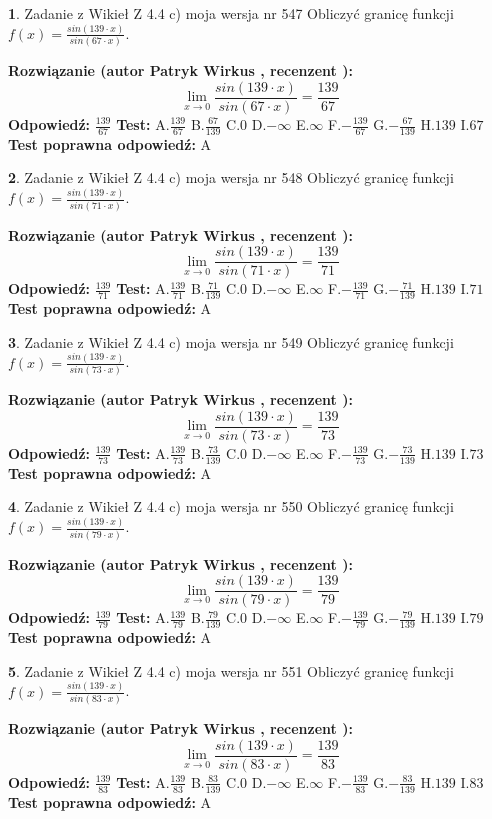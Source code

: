 \documentclass[12pt, a4paper]{article}
\theoremstyle{definition} %
\newtheorem{zad}{}
\newcommand{\zadStart}[1]{\begin{zad}#1\newline}
\newcommand{\zadStop}{\end{zad}}
\newcommand{\rozwStart}[2]{\noindent \textbf{Rozwiązanie (autor #1 , recenzent #2): }\newline}
\newcommand{\rozwStop}{\newline}
\newcommand{\odpStart}{\noindent \textbf{Odpowiedź:}\newline}
\newcommand{\odpStop}{\newline}
\newcommand{\testStart}{\noindent \textbf{Test:}\newline}
\newcommand{\testStop}{\newline}
\newcommand{\kluczStart}{\noindent \textbf{Test poprawna odpowiedź:}\newline}
\newcommand{\kluczStop}{\newline}
\begin{document}
\zadStart{Zadanie z Wikieł Z 4.4 c) moja wersja nr 547}
Obliczyć granicę funkcji $f(x)=\frac{sin(139\cdot x)}{sin(67\cdot x)}$.
\zadStop
\rozwStart{Patryk Wirkus}{}
$$\lim\limits_{x\to 0}\frac{sin(139\cdot x)}{sin(67\cdot x)}=
\frac{139}{67}$$
\rozwStop
\odpStart
$\frac{139}{67}$
\odpStop
\testStart
A.$\frac{139}{67}$
B.$\frac{67}{139}$
C.$0$
D.$-\infty$
E.$\infty$
F.$-\frac{139}{67}$
G.$-\frac{67}{139}$
H.$139$
I.$67$
\testStop
\kluczStart
A
\kluczStop



\zadStart{Zadanie z Wikieł Z 4.4 c) moja wersja nr 548}
Obliczyć granicę funkcji $f(x)=\frac{sin(139\cdot x)}{sin(71\cdot x)}$.
\zadStop
\rozwStart{Patryk Wirkus}{}
$$\lim\limits_{x\to 0}\frac{sin(139\cdot x)}{sin(71\cdot x)}=
\frac{139}{71}$$
\rozwStop
\odpStart
$\frac{139}{71}$
\odpStop
\testStart
A.$\frac{139}{71}$
B.$\frac{71}{139}$
C.$0$
D.$-\infty$
E.$\infty$
F.$-\frac{139}{71}$
G.$-\frac{71}{139}$
H.$139$
I.$71$
\testStop
\kluczStart
A
\kluczStop



\zadStart{Zadanie z Wikieł Z 4.4 c) moja wersja nr 549}
Obliczyć granicę funkcji $f(x)=\frac{sin(139\cdot x)}{sin(73\cdot x)}$.
\zadStop
\rozwStart{Patryk Wirkus}{}
$$\lim\limits_{x\to 0}\frac{sin(139\cdot x)}{sin(73\cdot x)}=
\frac{139}{73}$$
\rozwStop
\odpStart
$\frac{139}{73}$
\odpStop
\testStart
A.$\frac{139}{73}$
B.$\frac{73}{139}$
C.$0$
D.$-\infty$
E.$\infty$
F.$-\frac{139}{73}$
G.$-\frac{73}{139}$
H.$139$
I.$73$
\testStop
\kluczStart
A
\kluczStop



\zadStart{Zadanie z Wikieł Z 4.4 c) moja wersja nr 550}
Obliczyć granicę funkcji $f(x)=\frac{sin(139\cdot x)}{sin(79\cdot x)}$.
\zadStop
\rozwStart{Patryk Wirkus}{}
$$\lim\limits_{x\to 0}\frac{sin(139\cdot x)}{sin(79\cdot x)}=
\frac{139}{79}$$
\rozwStop
\odpStart
$\frac{139}{79}$
\odpStop
\testStart
A.$\frac{139}{79}$
B.$\frac{79}{139}$
C.$0$
D.$-\infty$
E.$\infty$
F.$-\frac{139}{79}$
G.$-\frac{79}{139}$
H.$139$
I.$79$
\testStop
\kluczStart
A
\kluczStop



\zadStart{Zadanie z Wikieł Z 4.4 c) moja wersja nr 551}
Obliczyć granicę funkcji $f(x)=\frac{sin(139\cdot x)}{sin(83\cdot x)}$.
\zadStop
\rozwStart{Patryk Wirkus}{}
$$\lim\limits_{x\to 0}\frac{sin(139\cdot x)}{sin(83\cdot x)}=
\frac{139}{83}$$
\rozwStop
\odpStart
$\frac{139}{83}$
\odpStop
\testStart
A.$\frac{139}{83}$
B.$\frac{83}{139}$
C.$0$
D.$-\infty$
E.$\infty$
F.$-\frac{139}{83}$
G.$-\frac{83}{139}$
H.$139$
I.$83$
\testStop
\kluczStart
A
\kluczStop
\end{document}
